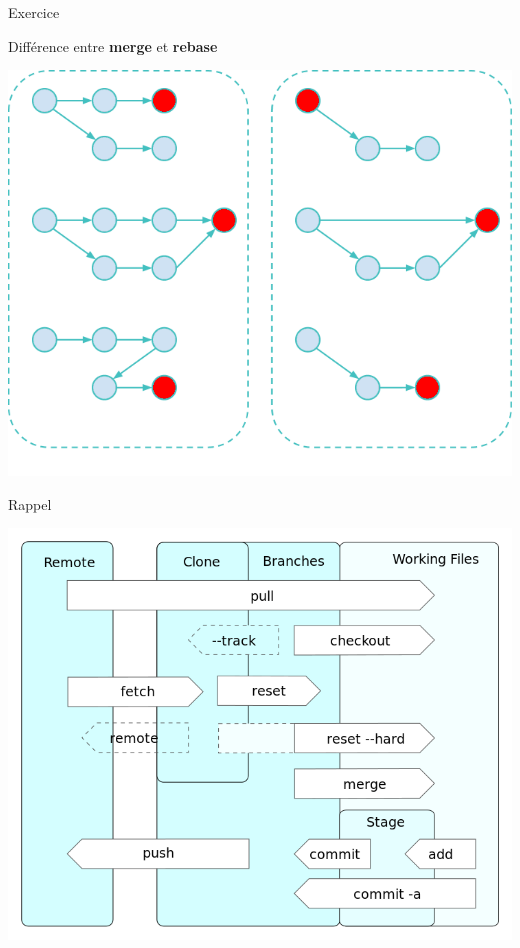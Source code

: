 \documentclass{beamer}
\begin{document}
\begin{frame}[fragile]{Exercice}
  \begin{exampleblock}{Différence entre \textbf{merge} et \textbf{rebase}}
    \begin{center}
      \includegraphics[width=0.7\linewidth]{images/merge-rebase}  
    \end{center}
  \end{exampleblock}
\end{frame}


\begin{frame}[fragile]{Rappel}
  \begin{center}
    \includegraphics[width=0.8\linewidth]{images/git-all}
  \end{center}
\end{frame}
\end{document}
